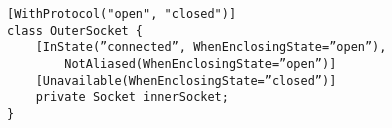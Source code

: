 \begin{listing}
    \centering
    \begin{verbatim}
[WithProtocol("open", "closed")]
class OuterSocket {
    [InState(”connected”, WhenEnclosingState=”open”),
        NotAliased(WhenEnclosingState=”open”)]
    [Unavailable(WhenEnclosingState=”closed”)]
    private Socket innerSocket;
}
    \end{verbatim}
    \caption{
        Relating a class's states with the \texttt{innerSocket} states.
        In this example, the \texttt{OuterSocket}'s \texttt{open} state is related with the \texttt{connected} state of the socket.
        This ensures that the \texttt{OuterSocket} is a well-behaved client of \texttt{innerSocket}.
    }
    \label{lst:csharp-fugue-states}
\end{listing}